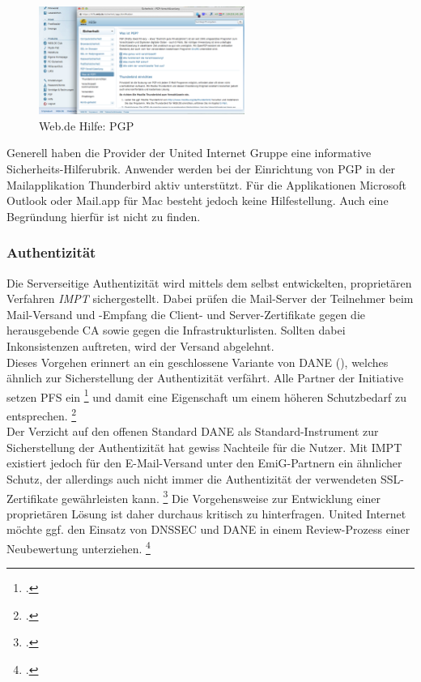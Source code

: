 \documentclass  [paper=a4,
				fontsize=12pt,
				listof=totoc,
				bibliography=totoc
				]{scrreprt}
\begin{document}
			\begin{figure} %
				\vspace{-12pt}
				\centering
				\includegraphics[width=0.6\textwidth]{images/Web-de_Hilfe_PGP}
				\caption[Web.de PGP]{Web.de Hilfe: PGP} 
				\label{fig:Web-de_Hilfe_PGP} %
				\vspace{-24pt}
			\end{figure}
			Generell haben die Provider der United Internet Gruppe eine informative Sicherheits-Hilferubrik.
			Anwender werden bei der Einrichtung von \ac{PGP} in der Mailapplikation Thunderbird aktiv unterstützt.
			Für die Applikationen Microsoft Outlook oder Mail.app für Mac besteht jedoch keine Hilfestellung.
			Auch eine Begründung hierfür ist nicht zu finden.
		\subsubsection{Authentizität}
		\label{subsubsec:emig-auth}	
			Die Serverseitige Authentizität wird mittels dem selbst entwickelten, proprietären Verfahren \textit{\ac{IMPT}} sichergestellt. 
			Dabei prüfen die Mail-Server der Teilnehmer beim Mail-Versand und -Empfang die Client- und Server-Zertifikate gegen die herausgebende \ac{CA} sowie gegen die Infrastrukturlisten.
			Sollten dabei Inkonsistenzen auftreten, wird der Versand abgelehnt.\\
			Dieses Vorgehen erinnert an ein geschlossene Variante von \ac{DANE} (), welches ähnlich zur Sicherstellung der Authentizität verfährt.
			Alle Partner der Initiative setzen \ac{PFS} ein
			\footcite[Vgl.][]{Zivadino14a}
			und damit eine Eigenschaft um einem höheren Schutzbedarf zu entsprechen.
			\footcite[Vgl.][]{Zivadino14b} 
			\medskip\\
			Der Verzicht auf den offenen Standard \ac{DANE} als Standard-Instrument zur Sicherstellung der Authentizität hat gewiss Nachteile für die Nutzer. 
			Mit \acl{IMPT} existiert jedoch für den E-Mail-Versand unter den \ac{EmiG}-Partnern ein ähnlicher Schutz, der allerdings auch nicht immer die Authentizität der verwendeten \ac{SSL}-Zertifikate gewährleisten kann.
			\footcite[Vgl.][]{Zivadino14a}
			Die Vorgehensweise zur Entwicklung einer proprietären Lösung ist daher durchaus kritisch zu hinterfragen. 
			United Internet möchte ggf. den Einsatz von \ac{DNSSEC} und \ac{DANE} in einem Review-Prozess einer Neubewertung unterziehen.
			\footcite[Vgl.][]{Zivadino14b}
\end{document}
